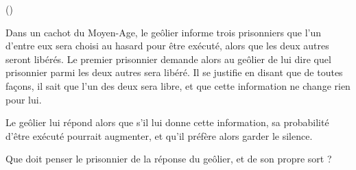 \begin{exercice}\label{exo3-12} (\mortelexo)

Dans un cachot du Moyen-Age, le ge\^olier informe trois prisonniers que l'un d'entre eux sera choisi au hasard pour \^etre ex\'ecut\'e, alors que les deux autres seront lib\'er\'es. Le premier prisonnier demande alors au ge\^olier de lui dire quel prisonnier parmi les deux autres sera lib\'er\'e. Il se justifie en disant que de toutes fa\c{c}ons, il sait que l'un des deux sera libre, et que cette information ne change rien pour lui. 

\smallskip

Le ge\^olier lui r\'epond alors que s'il lui donne cette information, sa probabilit\'e d'\^etre ex\'ecut\'e pourrait augmenter, et qu'il pr\'ef\`ere alors garder le silence. %

\smallskip

Que doit penser le prisonnier de la r\'eponse du ge\^olier, et de son propre sort ?

\medskip


\end{exercice}
